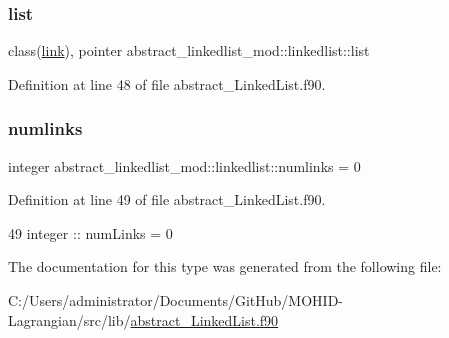 \subsubsection{\texorpdfstring{list}{list}}
{\footnotesize\ttfamily class(\mbox{\hyperlink{structlink__mod_1_1link}{link}}), pointer abstract\+\_\+linkedlist\+\_\+mod\+::linkedlist\+::list\hspace{0.3cm}{\ttfamily [private]}}



Definition at line 48 of file abstract\+\_\+\+Linked\+List.\+f90.

\mbox{\label{structabstract__linkedlist__mod_1_1linkedlist_a943157fc98cf02c94ed8fb50379a5e62}} 
\subsubsection{\texorpdfstring{numlinks}{numlinks}}
{\footnotesize\ttfamily integer abstract\+\_\+linkedlist\+\_\+mod\+::linkedlist\+::numlinks = 0\hspace{0.3cm}{\ttfamily [private]}}



Definition at line 49 of file abstract\+\_\+\+Linked\+List.\+f90.


\begin{DoxyCode}
49         \textcolor{keywordtype}{integer} :: numLinks = 0
\end{DoxyCode}


The documentation for this type was generated from the following file\+:\begin{DoxyCompactItemize}
\item 
C\+:/\+Users/administrator/\+Documents/\+Git\+Hub/\+M\+O\+H\+I\+D-\/\+Lagrangian/src/lib/\mbox{\hyperlink{abstract___linked_list_8f90}{abstract\+\_\+\+Linked\+List.\+f90}}\end{DoxyCompactItemize}
